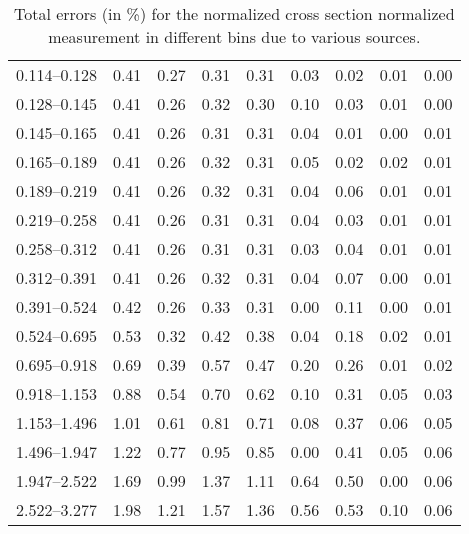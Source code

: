 \begin{table}
\begin{center}
\begin{tabular}{@{}l l l l l l l l l@{}}
            0.114--0.128 & 0.41 & 0.27 & 0.31 & 0.31 & 0.03 & 0.02 & 0.01 & 0.00 \\
            0.128--0.145 & 0.41 & 0.26 & 0.32 & 0.30 & 0.10 & 0.03 & 0.01 & 0.00 \\
            0.145--0.165 & 0.41 & 0.26 & 0.31 & 0.31 & 0.04 & 0.01 & 0.00 & 0.01 \\
            0.165--0.189 & 0.41 & 0.26 & 0.32 & 0.31 & 0.05 & 0.02 & 0.02 & 0.01 \\
            0.189--0.219 & 0.41 & 0.26 & 0.32 & 0.31 & 0.04 & 0.06 & 0.01 & 0.01 \\
            0.219--0.258 & 0.41 & 0.26 & 0.31 & 0.31 & 0.04 & 0.03 & 0.01 & 0.01 \\
            0.258--0.312 & 0.41 & 0.26 & 0.31 & 0.31 & 0.03 & 0.04 & 0.01 & 0.01 \\
            0.312--0.391 & 0.41 & 0.26 & 0.32 & 0.31 & 0.04 & 0.07 & 0.00 & 0.01 \\
            0.391--0.524 & 0.42 & 0.26 & 0.33 & 0.31 & 0.00 & 0.11 & 0.00 & 0.01 \\
            0.524--0.695 & 0.53 & 0.32 & 0.42 & 0.38 & 0.04 & 0.18 & 0.02 & 0.01 \\
            0.695--0.918 & 0.69 & 0.39 & 0.57 & 0.47 & 0.20 & 0.26 & 0.01 & 0.02 \\
            0.918--1.153 & 0.88 & 0.54 & 0.70 & 0.62 & 0.10 & 0.31 & 0.05 & 0.03 \\
            1.153--1.496 & 1.01 & 0.61 & 0.81 & 0.71 & 0.08 & 0.37 & 0.06 & 0.05 \\
            1.496--1.947 & 1.22 & 0.77 & 0.95 & 0.85 & 0.00 & 0.41 & 0.05 & 0.06 \\
            1.947--2.522 & 1.69 & 0.99 & 1.37 & 1.11 & 0.64 & 0.50 & 0.00 & 0.06 \\
            2.522--3.277 & 1.98 & 1.21 & 1.57 & 1.36 & 0.56 & 0.53 & 0.10 & 0.06 \\
            \bottomrule
        \end{tabular}
    \end{center}
    \caption[
        Total errors (in \%) for the normalized cross section normalized
        measurement.
    ]{
        Total errors (in \%) for the normalized cross section normalized
        measurement in different \phistar bins due to various sources.
    }
    \label{tab:sys_uncert_norm}
\end{table}
